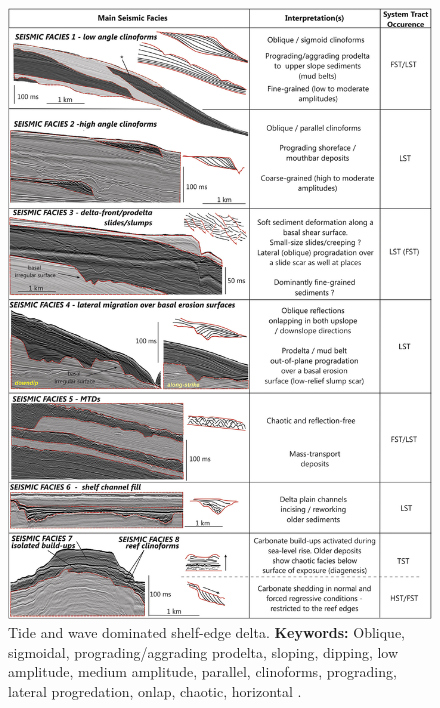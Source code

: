 \begin{figure}[h!]
    \centering
    \includegraphics[width=0.9\linewidth]{Figures/0.3Seismic/Bourget2014_trace_1.png}
    \caption[Tide and wave dominated shelf-edge delta.]{Tide and wave dominated shelf-edge delta. \textbf{Keywords: } Oblique, sigmoidal, prograding/aggrading prodelta, sloping, dipping, low amplitude, medium amplitude, parallel, clinoforms, prograding, lateral progredation, onlap, chaotic, horizontal \citep{Bourget2014}.}
    \label{fig:Bourget2014-1}
\end{figure}

